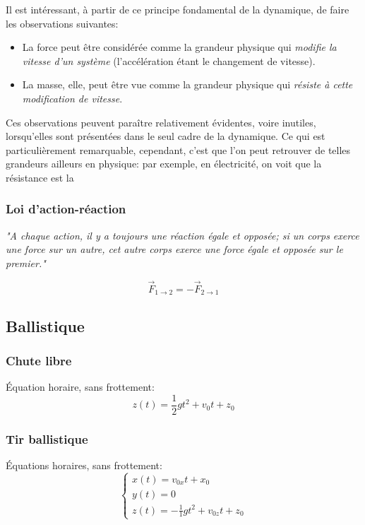 \documentclass{article}
\numberwithin{equation}{section}
\begin{document}
Il est intéressant, à partir de ce principe fondamental de la dynamique, de faire les observations suivantes:
\begin{itemize}
	\item La force peut être considérée comme la grandeur physique qui \emph{modifie la vitesse d'un système} (l'accélération étant le changement de vitesse).
	\item La masse, elle, peut être vue comme la grandeur physique qui \emph{résiste à cette modification de vitesse}.
\end{itemize}
Ces observations peuvent paraître relativement évidentes, voire inutiles, lorsqu'elles sont présentées dans le seul cadre de la dynamique. Ce qui est particulièrement remarquable, cependant, c'est que l'on peut retrouver de telles grandeurs ailleurs en physique: par exemple, en électricité, on voit que la résistance est la 

\subsubsection{Loi d'action-réaction} \label{sec:actionreaction}
\begin{center}
	\emph{"A chaque action, il y a toujours une réaction égale et opposée; si un corps exerce une force sur un autre, cet autre corps exerce une force égale et opposée sur le premier."}
\end{center}
\begin{equation}
	\boxed{\vec F_{1 \to 2} = - \vec F_{2 \to 1}}
\end{equation}

\subsection{Ballistique}
\subsubsection{Chute libre}
Équation horaire, sans frottement:
\begin{equation}
	\boxed{z(t) = \frac{1}{2} gt^2 + v_0t + z_0}
\end{equation}

\subsubsection{Tir ballistique}
Équations horaires, sans frottement:
\begin{equation}
	\boxed{\begin{cases}
		x(t) = v_{0x}t + x_0 \\
		y(t) = 0 \\
		z(t) = -\frac{1}{1}gt^2 + v_{0z}t + z_0
	\end{cases}}
\end{equation}
\end{document}
